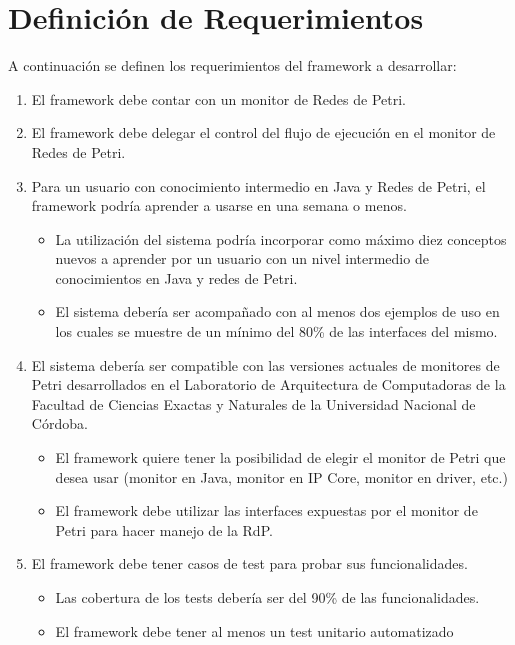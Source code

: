 \section{Definición de Requerimientos}
\label{sec:definicion_reqs}
A continuación se definen los requerimientos del framework a desarrollar:
\begin{enumerate}
    \item El framework debe contar con un monitor de Redes de Petri.
    \item El framework debe delegar el control del flujo de ejecución en el
    monitor de Redes de Petri.
    \item Para un usuario con conocimiento intermedio en Java y Redes de Petri, el
    framework podría aprender a usarse en una semana o menos.
        \begin{itemize}
            \item La utilización del sistema podría incorporar como máximo diez
            conceptos nuevos a aprender por un usuario con un nivel intermedio
            de conocimientos en Java y redes de Petri.
            \item El sistema debería ser acompañado con al menos dos ejemplos de uso
            en los cuales se muestre de un mínimo del 80\% de las interfaces del
            mismo.
        \end{itemize}
    \item El sistema debería ser compatible con las versiones actuales de
    monitores de Petri desarrollados en el Laboratorio de Arquitectura de Computadoras de la
    Facultad de Ciencias Exactas y Naturales de la Universidad Nacional de Córdoba.
        \begin{itemize}
            \item El framework quiere tener la posibilidad de elegir el monitor de
            Petri que desea usar (monitor en Java, monitor en IP Core, monitor en
            driver, etc.)
            \item El framework debe utilizar las interfaces expuestas por el monitor
            de Petri para hacer manejo de la RdP.
        \end{itemize}
    \item El framework debe tener casos de test para probar sus funcionalidades.
        \begin{itemize}
            \item Las cobertura de los tests debería ser del 90\% de las
            funcionalidades.
            \item El framework debe tener al menos un test unitario automatizado

\end{itemize}
\end{enumerate}
